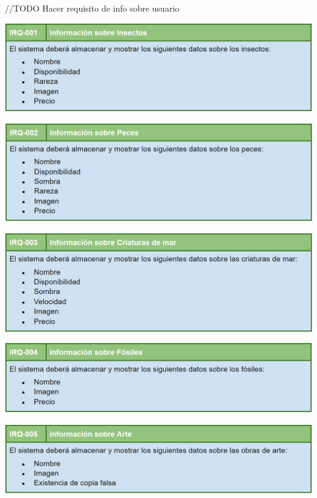 	\bigskip
	
	//TODO Hacer requisito de info sobre usuario
	
	\includegraphics[width=\textwidth]{img/cap5/IR/1.png}
	
	\bigskip
	
	\includegraphics[width=\textwidth]{img/cap5/IR/2.png}
	
	\bigskip
	
	\includegraphics[width=\textwidth]{img/cap5/IR/3.png}
	
	\bigskip
	
	\includegraphics[width=\textwidth]{img/cap5/IR/4.png}
	
	\bigskip
	
	\includegraphics[width=\textwidth]{img/cap5/IR/5.png}
	
